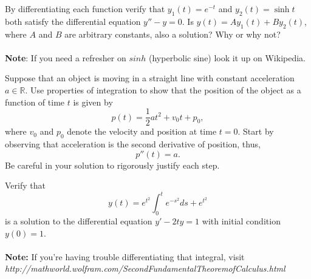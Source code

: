 \documentclass[12pt,letterpaper]{hmcpset}
\begin{document}

\begin{problem}[2]
  By differentiating each function verify that $y_1(t)=e^{-t}$ and $y_2(t)=\sinh t$ both satisfy the differential equation $y''-y=0$. Is $y(t)=Ay_1(t)+By_2(t)$, where $A$ and $B$ are arbitrary constants, also a solution? Why or why not?
  \\\\
  \textbf{Note}: If you need a refresher on $sinh$ (hyperbolic sine) look it up on Wikipedia.
\end{problem}

\begin{solution}
\vfill
\end{solution}
\newpage

\begin{problem}[3]
  Suppose that an object is moving in a straight line with constant acceleration $a \in \mathbb{R}$.  Use properties of integration to show that the position of the object as a function of time $t$ is given by $$p(t) = \frac{1}{2} a t^2 + v_0 t + p_0,$$ where $v_0$ and $p_0$ denote the velocity and position at time $t=0$.   Start by observing that acceleration is the second derivative of position, thus, 
  \[  p''(t) = a.  \]
  Be careful in your solution to rigorously justify each step.
\end{problem}

\begin{solution}
\vfill
\end{solution}
\newpage

\begin{problem}[4]
  \vspace{1.5mm}
  Verify that 
  \vspace{-.25in}
  \[ y(t)=e^{t^2}\int_0^te^{-s^2}ds+e^{t^2} \]
  is a solution to the differential equation $y'-2ty=1$ with initial condition $y(0)=1$.
  \\\\
  \textbf{Note:} If you're having trouble differentiating that integral, visit\\
  \textit{http://mathworld.wolfram.com/SecondFundamentalTheoremofCalculus.html}
\end{problem}

\begin{solution}
\vfill
\end{solution}
\newpage
\end{document}
